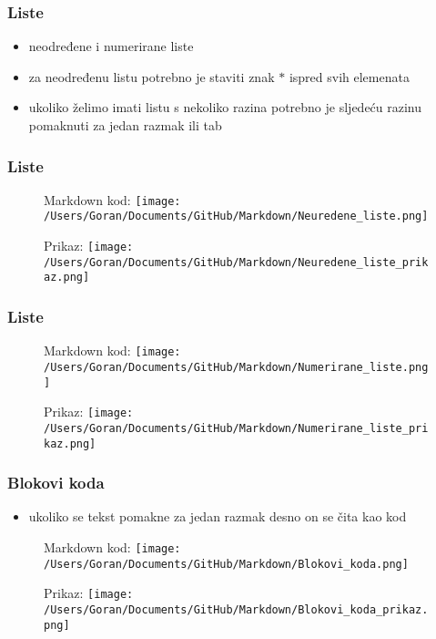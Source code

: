 \documentclass{beamer}
\begin{document}
\newpage
\begin{frame}
\frametitle{Liste}
\begin{itemize}
\item neodređene i numerirane liste
\item za neodređenu listu potrebno je staviti znak $*$ ispred svih elemenata
\item ukoliko želimo imati listu s nekoliko razina potrebno je sljedeću razinu pomaknuti za jedan razmak ili tab
\end{itemize}
\end{frame}

\newpage
\begin{frame}
\frametitle{Liste}
\begin{figure}
{Markdown kod:}
\texttt{[image: /Users/Goran/Documents/GitHub/Markdown/Neuredene\_liste.png]}
\end{figure}

\begin{figure}
{Prikaz:}
\texttt{[image: /Users/Goran/Documents/GitHub/Markdown/Neuredene\_liste\_prikaz.png]}
\end{figure}
\end{frame}

\newpage
\begin{frame}
\frametitle{Liste}
\begin{figure}
{Markdown kod:}
\texttt{[image: /Users/Goran/Documents/GitHub/Markdown/Numerirane\_liste.png]}
\end{figure}

\begin{figure}
{Prikaz:}
\texttt{[image: /Users/Goran/Documents/GitHub/Markdown/Numerirane\_liste\_prikaz.png]}
\end{figure}
\end{frame}

\newpage
\begin{frame}
\frametitle{Blokovi koda}
\begin{itemize}
\item ukoliko se tekst pomakne za jedan razmak desno on se čita kao kod
\end{itemize}

\begin{figure}
{Markdown kod:}
\texttt{[image: /Users/Goran/Documents/GitHub/Markdown/Blokovi\_koda.png]}
\end{figure}

\begin{figure}
{Prikaz:}
\texttt{[image: /Users/Goran/Documents/GitHub/Markdown/Blokovi\_koda\_prikaz.png]}
\end{figure}


\end{frame}
\end{document}
